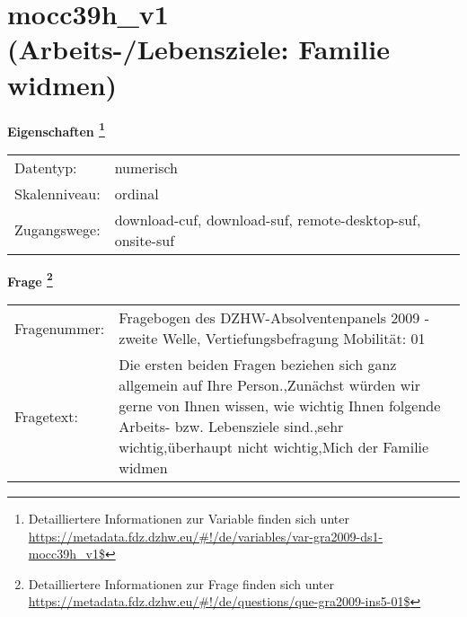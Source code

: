 
    \setcounter{footnote}{0}

    \vspace*{-1.8cm}
	\section{mocc39h\_v1 (Arbeits-/Lebensziele: Familie widmen)}
	\label{section:mocc39h_v1}



    \vspace*{0.5cm}
    \noindent\textbf{Eigenschaften
	\footnote{Detailliertere Informationen zur Variable finden sich unter
		\url{https://metadata.fdz.dzhw.eu/\#!/de/variables/var-gra2009-ds1-mocc39h_v1$}}}\\
	\begin{tabularx}{\hsize}{@{}lX}
	Datentyp: & numerisch \\
	Skalenniveau: & ordinal \\
	Zugangswege: &
	  download-cuf, 
	  download-suf, 
	  remote-desktop-suf, 
	  onsite-suf
 \\
    \end{tabularx}



				\vspace*{0.5cm}
                \noindent\textbf{Frage
	                \footnote{Detailliertere Informationen zur Frage finden sich unter
		              \url{https://metadata.fdz.dzhw.eu/\#!/de/questions/que-gra2009-ins5-01$}}}\\
				\begin{tabularx}{\hsize}{@{}lX}
					Fragenummer: &
					  Fragebogen des DZHW-Absolventenpanels 2009 - zweite Welle, Vertiefungsbefragung Mobilität:
					  01
 \\
					Fragetext: & Die ersten beiden Fragen beziehen sich ganz allgemein auf Ihre Person.,Zunächst würden wir gerne von Ihnen wissen, wie wichtig Ihnen folgende Arbeits- bzw. Lebensziele sind.,sehr wichtig,überhaupt nicht wichtig,Mich der Familie widmen \\
				\end{tabularx}





